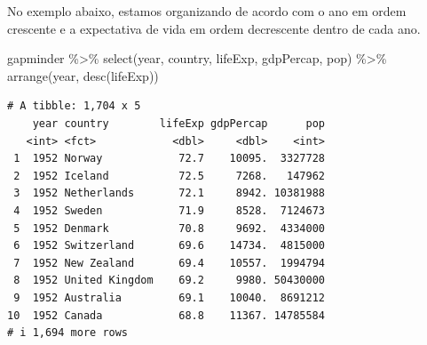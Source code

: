 \documentclass[
  portuguese,
  letterpaper,
  DIV=11,
  numbers=noendperiod]{scrreprt}
\newenvironment{Shaded}{\begin{snugshade}}{\end{snugshade}}
\newcommand{\FunctionTok}[1]{\textcolor[rgb]{0.28,0.35,0.67}{#1}}
\newcommand{\NormalTok}[1]{\textcolor[rgb]{0.00,0.23,0.31}{#1}}
\newcommand{\SpecialCharTok}[1]{\textcolor[rgb]{0.37,0.37,0.37}{#1}}
\theoremstyle{definition}
\theoremstyle{remark}
\begin{document}
No exemplo abaixo, estamos organizando de acordo com o ano em ordem
crescente e a expectativa de vida em ordem decrescente dentro de cada
ano.

\begin{Shaded}
\begin{Highlighting}[]
\NormalTok{gapminder }\SpecialCharTok{\%\textgreater{}\%}
  \FunctionTok{select}\NormalTok{(year, country, lifeExp, gdpPercap, pop) }\SpecialCharTok{\%\textgreater{}\%}
  \FunctionTok{arrange}\NormalTok{(year, }\FunctionTok{desc}\NormalTok{(lifeExp))}
\end{Highlighting}
\end{Shaded}

\begin{verbatim}
# A tibble: 1,704 x 5
    year country        lifeExp gdpPercap      pop
   <int> <fct>            <dbl>     <dbl>    <int>
 1  1952 Norway            72.7    10095.  3327728
 2  1952 Iceland           72.5     7268.   147962
 3  1952 Netherlands       72.1     8942. 10381988
 4  1952 Sweden            71.9     8528.  7124673
 5  1952 Denmark           70.8     9692.  4334000
 6  1952 Switzerland       69.6    14734.  4815000
 7  1952 New Zealand       69.4    10557.  1994794
 8  1952 United Kingdom    69.2     9980. 50430000
 9  1952 Australia         69.1    10040.  8691212
10  1952 Canada            68.8    11367. 14785584
# i 1,694 more rows
\end{verbatim}
\end{document}
